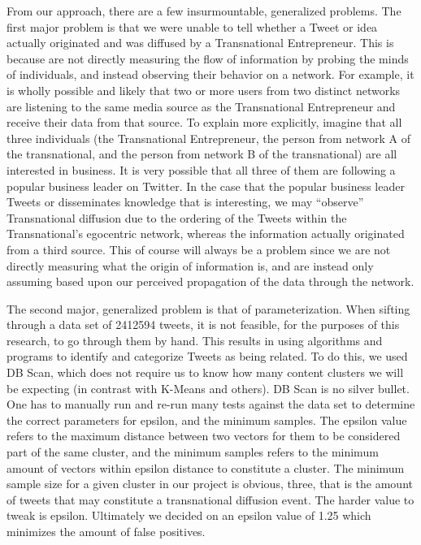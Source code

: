 From our approach, there are a few insurmountable, generalized
problems. The first major problem is that we were unable to tell
whether a Tweet or idea actually originated and was diffused by a
Transnational Entrepreneur. This is because are not directly measuring
the flow of information by probing the minds of individuals, and
instead observing their behavior on a network. For example, it is
wholly possible and likely that two or more users from two distinct
networks are listening to the same media source as the Transnational
Entrepreneur and receive their data from that source. To explain more
explicitly, imagine that all three individuals (the Transnational
Entrepreneur, the person from network A of the transnational, and the
person from network B of the transnational) are all interested in
business. It is very possible that all three of them are following a
popular business leader on Twitter. In the case that the popular
business leader Tweets or disseminates knowledge that is interesting,
we may ``observe'' Transnational diffusion due to the ordering of the
Tweets within the Transnational's egocentric network, whereas the
information actually originated from a third source. This of course
will always be a problem since we are not directly measuring what the
origin of information is, and are instead only assuming based upon our
perceived propagation of the data through the network.

The second major, generalized problem is that of parameterization.
When sifting through a data set of 2412594 tweets, it is not feasible,
for the purposes of this research, to go through them by hand. This
results in using algorithms and programs to identify and categorize
Tweets as being related. To do this, we used DB Scan, which does not
require us to know how many content clusters we will be expecting (in
contrast with K-Means and others). DB Scan is no silver bullet. One
has to manually run and re-run many tests against the data set to
determine the correct parameters for epsilon, and the minimum
samples. The epsilon value refers to the maximum distance between two
vectors for them to be considered part of the same cluster, and the
minimum samples refers to the minimum amount of vectors within epsilon
distance to constitute a cluster. The minimum sample size for a given
cluster in our project is obvious, three, that is the amount of tweets
that may constitute a transnational diffusion event. The harder value
to tweak is epsilon. Ultimately we decided on an epsilon value of 1.25
which minimizes the amount of false positives.


